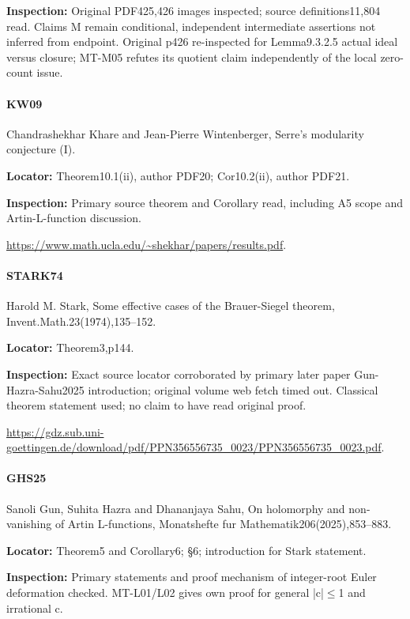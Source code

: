 \documentclass[11pt,a4paper]{article}
\begin{document}
\textbf{Inspection:} Original PDF425,426 images inspected; source definitions11,804 read.\allowbreak{} Claims M remain conditional, independent intermediate assertions not inferred from endpoint.\allowbreak{} Original p426 re-inspected for Lemma9.\allowbreak{}3.\allowbreak{}2.\allowbreak{}5 actual ideal versus closure; MT-M05 refutes its quotient claim independently of the local zero-count issue.\allowbreak{}


\paragraph{KW09} Chandrashekhar Khare and Jean-Pierre Wintenberger, Serre's modularity conjecture (I).

\textbf{Locator:} Theorem10.\allowbreak{}1(ii), author PDF20; Cor10.\allowbreak{}2(ii), author PDF21.

\textbf{Inspection:} Primary source theorem and Corollary read, including A5 scope and Artin-L-function discussion.\allowbreak{}

\url{https://www.math.ucla.edu/~shekhar/papers/results.pdf}.

\paragraph{STARK74} Harold M.\allowbreak{} Stark, Some effective cases of the Brauer-Siegel theorem, Invent.\allowbreak{}Math.\allowbreak{}23(1974),135–\allowbreak{}152.

\textbf{Locator:} Theorem3,p144.

\textbf{Inspection:} Exact source locator corroborated by primary later paper Gun-Hazra-Sahu2025 introduction; original volume web fetch timed out.\allowbreak{} Classical theorem statement used; no claim to have read original proof.\allowbreak{}

\url{https://gdz.sub.uni-goettingen.de/download/pdf/PPN356556735_0023/PPN356556735_0023.pdf}.

\paragraph{GHS25} Sanoli Gun, Suhita Hazra and Dhananjaya Sahu, On holomorphy and non-vanishing of Artin L-functions, Monatshefte fur Mathematik206(2025),853–\allowbreak{}883.

\textbf{Locator:} Theorem5 and Corollary6; §6; introduction for Stark statement.

\textbf{Inspection:} Primary statements and proof mechanism of integer-root Euler deformation checked.\allowbreak{} MT-L01/\allowbreak{}L02 gives own proof for general |c|\ensuremath{\le}1 and irrational c.\allowbreak{}
\end{document}
